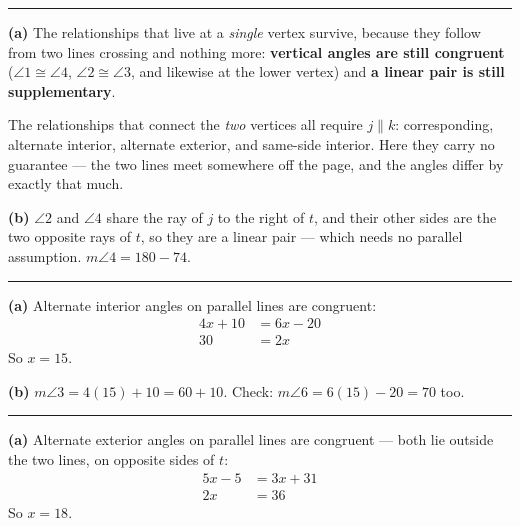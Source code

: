\documentclass[12pt]{article}
\begin{document}
\vspace{0.2cm}\noindent\rule{\linewidth}{0.2pt}


\textbf{(a)} The relationships that live at a \emph{single} vertex survive, because they follow from two lines crossing and nothing more: \textbf{vertical angles are still congruent} ($\angle 1 \cong \angle 4$, $\angle 2 \cong \angle 3$, and likewise at the lower vertex) and \textbf{a linear pair is still supplementary}.

The relationships that connect the \emph{two} vertices all require $j \parallel k$: corresponding, alternate interior, alternate exterior, and same-side interior. Here they carry no guarantee --- the two lines meet somewhere off the page, and the angles differ by exactly that much.

\textbf{(b)} $\angle 2$ and $\angle 4$ share the ray of $j$ to the right of $t$, and their other sides are the two opposite rays of $t$, so they are a linear pair --- which needs no parallel assumption. $m\angle 4 = 180 - 74$. 

\vspace{0.2cm}\noindent\rule{\linewidth}{0.2pt}


\textbf{(a)} Alternate interior angles on parallel lines are congruent:
\begin{align*}
  4x + 10 &= 6x - 20 \\
  30 &= 2x
\end{align*}
So $x = 15$. 

\textbf{(b)} $m\angle 3 = 4(15) + 10 = 60 + 10$. Check: $m\angle 6 = 6(15) - 20 = 70$ too. 

\vspace{0.2cm}\noindent\rule{\linewidth}{0.2pt}


\textbf{(a)} Alternate exterior angles on parallel lines are congruent --- both lie outside the two lines, on opposite sides of $t$:
\begin{align*}
  5x - 5 &= 3x + 31 \\
  2x &= 36
\end{align*}
So $x = 18$. 
\end{document}
